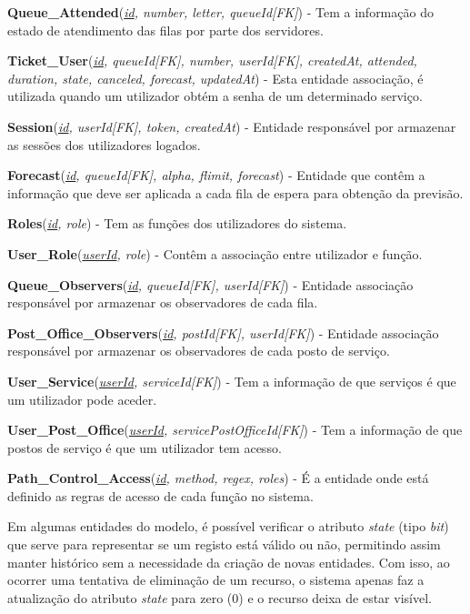 {\textbf{Queue\_Attended}(\textit{\underline{id}, number, letter, queueId[FK]}) - Tem a informação do estado de atendimento das filas por parte dos servidores.

\textbf{Ticket\_User}(\textit{\underline{id}, queueId[FK], number, userId[FK], createdAt, attended, duration, state, canceled, forecast, updatedAt}) - Esta entidade associação, é utilizada quando um utilizador obtém a senha de um determinado serviço. 

\textbf{Session}(\textit{\underline{id}, userId[FK], token, createdAt}) - Entidade responsável por armazenar as sessões dos utilizadores logados.

\textbf{Forecast}(\textit{\underline{id}, queueId[FK], alpha, flimit, forecast}) - Entidade que contêm a informação que deve ser aplicada a cada fila de espera para obtenção da previsão.

\textbf{Roles}(\textit{\underline{id}, role}) - Tem as funções dos utilizadores do sistema.

\textbf{User\_Role}(\textit{\underline{userId}, role}) - Contêm a associação entre utilizador e função.

\textbf{Queue\_Observers}(\textit{\underline{id}, queueId[FK], userId[FK]}) - Entidade associação responsável por armazenar os observadores de cada fila.

\textbf{Post\_Office\_Observers}(\textit{\underline{id}, postId[FK], userId[FK]}) - Entidade associação responsável por armazenar os observadores de cada posto de serviço.

\textbf{User\_Service}(\textit{\underline{userId}, serviceId[FK]}) - Tem a informação de que serviços é que um utilizador pode aceder. 

\textbf{User\_Post\_Office}(\textit{\underline{userId}, servicePostOfficeId[FK]}) - Tem a informação de que postos de serviço é que um utilizador tem acesso.

\textbf{Path\_Control\_Access}(\textit{\underline{id}, method, regex, roles}) - É a entidade onde está definido as regras de acesso de cada função no sistema.

Em algumas entidades do modelo, é possível verificar o atributo \textit{state} (tipo \textit{bit}) que serve para representar se um registo está válido ou não, permitindo assim manter histórico sem a necessidade da criação de novas entidades. Com isso, ao ocorrer uma tentativa de eliminação de um recurso, o sistema apenas faz a atualização do atributo \textit{state} para zero (0) e o recurso deixa de estar visível.

}

